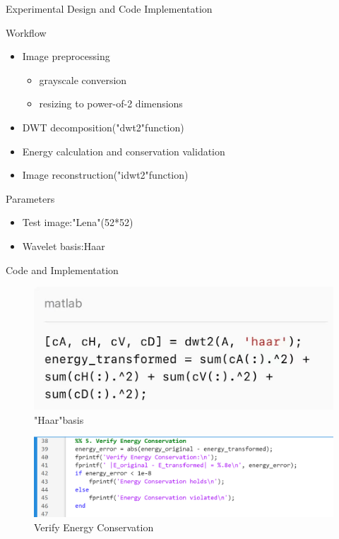 \documentclass[11pt]{beamer}
\begin{document}
\begin{frame}{Experimental Design and Code Implementation}
 \begin{block}{Workflow}
    \begin{itemize}
      \item Image preprocessing
      \begin{itemize}
           \item grayscale conversion
           \item resizing to power-of-2 dimensions
      \end{itemize}
      \item DWT decomposition("dwt2"function)
      \item Energy calculation and conservation validation
      \item Image reconstruction("idwt2"function)
    \end{itemize}
  \end{block}
\begin{block}{Parameters}
    \begin{itemize}
      \item Test image:"Lena"(52*52)
      \item Wavelet basis:Haar
    \end{itemize}
  \end{block}

\end{frame}

\begin{frame}{Code and Implementation}
    \begin{figure}
        \centering
        \includegraphics[width=0.5\linewidth]{代码2.jpg}
        \caption{"Haar"basis}
        \label{fig:placeholder}
    \end{figure}
    \begin{figure}
        \centering
        \includegraphics[width=1\linewidth]{代码3.png}
        \caption{Verify Energy Conservation}
        \label{fig:placeholder}
    \end{figure}
\end{frame}
\end{document}
